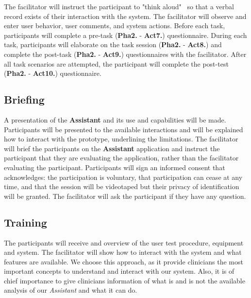 The facilitator will instruct the participant to "think aloud"~\cite{bolle2016authors, kilsdonk2016uncovering} so that a verbal record exists of their interaction with the system. The facilitator will observe and enter user behavior, user comments, and system actions. Before each task, participants will complete a pre-task (\textbf{Pha2.} - \textbf{Act7.}) questionnaire. During each task, participants will elaborate on the task session (\textbf{Pha2.} - \textbf{Act8.}) and complete the post-task (\textbf{Pha2.} - \textbf{Act9.}) questionnaires with the facilitator. After all task scenarios are attempted, the participant will complete the post-test (\textbf{Pha2.} - \textbf{Act10.}) questionnaire.



\subsection{Briefing}

A presentation of the \textbf{Assistant} and its use and capabilities will be made. Participants will be presented to the available interactions and will be explained how to interact with the prototype, underlining the limitations. The facilitator will brief the participants on the \textbf{Assistant} application and instruct the participant that they are evaluating the application, rather than the facilitator evaluating the participant. Participants will sign an informed consent that acknowledges: the participation is voluntary, that participation can cease at any time, and that the session will be videotaped but their privacy of identification will be granted. The facilitator will ask the participant if they have any question.



\subsection{Training}

The participants will receive and overview of the user test procedure, equipment and system. The facilitator will show how to interact with the system and what features are available. We choose this approach, as it provide clinicians the most important concepts to understand and interact with our system. Also, it is of chief importance to give clinicians information of what is and is not the available analysis of our \textit{Assistant} and what it can do.


\clearpage